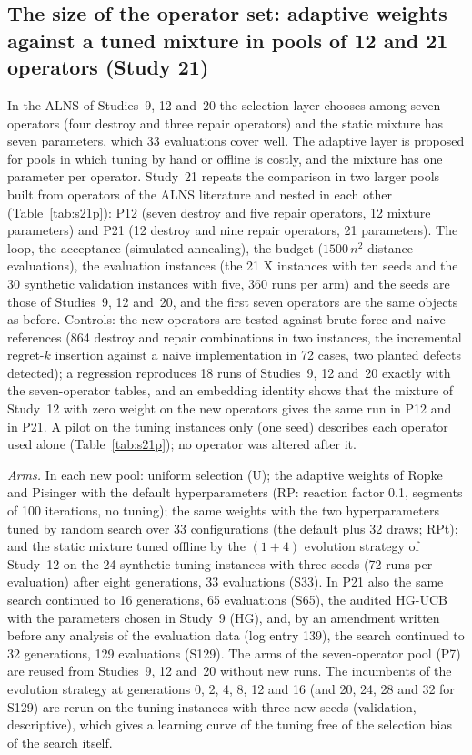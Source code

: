 \subsection{The size of the operator set: adaptive weights against a tuned mixture in pools of 12 and 21 operators (Study 21)}\label{sec:s21design}
In the ALNS of Studies~9, 12 and~20 the selection layer chooses among seven operators (four destroy and three repair operators) and the static mixture has seven parameters, which 33 evaluations cover well. The adaptive layer is proposed for pools in which tuning by hand or offline is costly, and the mixture has one parameter per operator. Study~21 repeats the comparison in two larger pools built from operators of the ALNS literature and nested in each other (Table~\ref{tab:s21p}): P12 (seven destroy and five repair operators, 12 mixture parameters) and P21 (12 destroy and nine repair operators, 21 parameters). The loop, the acceptance (simulated annealing), the budget ($1500\,n^2$ distance evaluations), the evaluation instances (the 21 X instances with ten seeds and the 30 synthetic validation instances with five, 360 runs per arm) and the seeds are those of Studies~9, 12 and~20, and the first seven operators are the same objects as before. Controls: the new operators are tested against brute-force and naive references (864 destroy and repair combinations in two instances, the incremental regret-$k$ insertion against a naive implementation in 72 cases, two planted defects detected); a regression reproduces 18 runs of Studies~9, 12 and~20 exactly with the seven-operator tables, and an embedding identity shows that the mixture of Study~12 with zero weight on the new operators gives the same run in P12 and in P21. A pilot on the tuning instances only (one seed) describes each operator used alone (Table~\ref{tab:s21p}); no operator was altered after it.

\emph{Arms.} In each new pool: uniform selection (U); the adaptive weights of Ropke and Pisinger with the default hyperparameters (RP: reaction factor 0.1, segments of 100 iterations, no tuning); the same weights with the two hyperparameters tuned by random search over 33 configurations (the default plus 32 draws; RPt); and the static mixture tuned offline by the $(1+4)$ evolution strategy of Study~12 on the 24 synthetic tuning instances with three seeds (72 runs per evaluation) after eight generations, 33 evaluations (S33). In P21 also the same search continued to 16 generations, 65 evaluations (S65), the audited HG-UCB with the parameters chosen in Study~9 (HG), and, by an amendment written before any analysis of the evaluation data (log entry 139), the search continued to 32 generations, 129 evaluations (S129). The arms of the seven-operator pool (P7) are reused from Studies~9, 12 and~20 without new runs. The incumbents of the evolution strategy at generations 0, 2, 4, 8, 12 and 16 (and 20, 24, 28 and 32 for S129) are rerun on the tuning instances with three new seeds (validation, descriptive), which gives a learning curve of the tuning free of the selection bias of the search itself.

